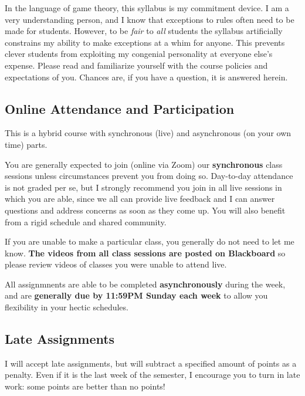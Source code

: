 \documentclass{article}
\begin{document}
In the language of game theory, this syllabus is my commitment device. I
am a very understanding person, and I know that exceptions to rules
often need to be made for students. However, to be \emph{fair} to
\emph{all} students the syllabus artificially constrains my ability to
make exceptions at a whim for anyone. This prevents clever students from
exploiting my congenial personality at everyone else's expense. Please
read and familiarize yourself with the course policies and expectations
of you. Chances are, if you have a question, it is answered herein.

\hypertarget{online-attendance-and-participation}{%
\subsection*{Online Attendance and
Participation}\label{online-attendance-and-participation}}

This is a hybrid course with synchronous (live) and asynchronous (on
your own time) parts.

You are generally expected to join (online via Zoom) our
\textbf{synchronous} class sessions unless circumstances prevent you
from doing so. Day-to-day attendance is not graded per se, but I
strongly recommend you join in all live sessions in which you are able,
since we all can provide live feedback and I can answer questions and
address concerns as soon as they come up. You will also benefit from a
rigid schedule and shared community.

If you are unable to make a particular class, you generally do not need
to let me know. \textbf{The videos from all class sessions are posted on
Blackboard} so please review videos of classes you were unable to attend
live.

All assignmnents are able to be completed \textbf{asynchronously} during
the week, and are \textbf{generally due by 11:59PM Sunday each week} to
allow you flexibility in your hectic schedules.

\hypertarget{late-assignments}{%
\subsection*{Late Assignments}\label{late-assignments}}

I will accept late assignments, but will subtract a specified amount of
points as a penalty. Even if it is the last week of the semester, I
encourage you to turn in late work: some points are better than no
points!
\end{document}
